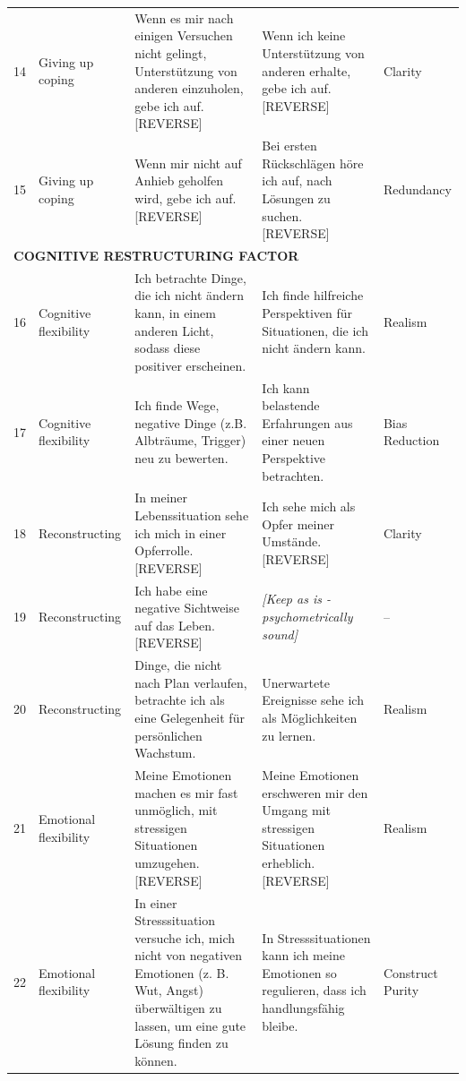 \documentclass[12pt,a4paper]{article}
\begin{document}
\begin{longtable}{p{}p{}p{}p{}p{}}
14 & Giving up coping & Wenn es mir nach einigen Versuchen nicht gelingt, Unterstützung von anderen einzuholen, gebe ich auf. [REVERSE] & Wenn ich keine Unterstützung von anderen erhalte, gebe ich auf. [REVERSE] & Clarity \\

15 & Giving up coping & Wenn mir nicht auf Anhieb geholfen wird, gebe ich auf. [REVERSE] & Bei ersten Rückschlägen höre ich auf, nach Lösungen zu suchen. [REVERSE] & Redundancy \\

\midrule
\multicolumn{5}{l}{\textbf{COGNITIVE RESTRUCTURING FACTOR}} \\
\midrule

16 & Cognitive flexibility & Ich betrachte Dinge, die ich nicht ändern kann, in einem anderen Licht, sodass diese positiver erscheinen. & Ich finde hilfreiche Perspektiven für Situationen, die ich nicht ändern kann. & Realism \\

17 & Cognitive flexibility & Ich finde Wege, negative Dinge (z.B. Albträume, Trigger) neu zu bewerten. & Ich kann belastende Erfahrungen aus einer neuen Perspektive betrachten. & Bias Reduction \\

18 & Reconstructing & In meiner Lebenssituation sehe ich mich in einer Opferrolle. [REVERSE] & Ich sehe mich als Opfer meiner Umstände. [REVERSE] & Clarity \\

19 & Reconstructing & Ich habe eine negative Sichtweise auf das Leben. [REVERSE] & \textit{[Keep as is - psychometrically sound]} & -- \\

20 & Reconstructing & Dinge, die nicht nach Plan verlaufen, betrachte ich als eine Gelegenheit für persönlichen Wachstum. & Unerwartete Ereignisse sehe ich als Möglichkeiten zu lernen. & Realism \\

21 & Emotional flexibility & Meine Emotionen machen es mir fast unmöglich, mit stressigen Situationen umzugehen. [REVERSE] & Meine Emotionen erschweren mir den Umgang mit stressigen Situationen erheblich. [REVERSE] & Realism \\

22 & Emotional flexibility & In einer Stresssituation versuche ich, mich nicht von negativen Emotionen (z. B. Wut, Angst) überwältigen zu lassen, um eine gute Lösung finden zu können. & In Stresssituationen kann ich meine Emotionen so regulieren, dass ich handlungsfähig bleibe. & Construct Purity \\


\end{longtable}
\end{document}
